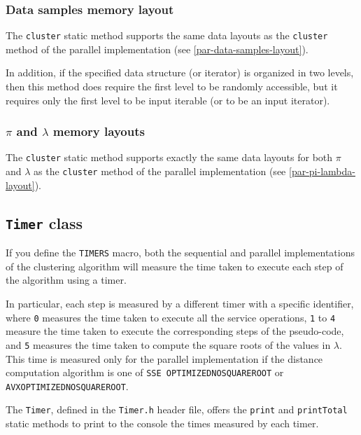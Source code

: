 \documentclass{article}
\begin{document}
\hypertarget{seq-data-samples-layout}{
\subsubsection{Data samples memory layout}
\label{seq-data-samples-layout}}

The \texttt{cluster} static method supports the same data layouts as the \texttt{cluster} method
of the parallel implementation (see \ref{par-data-samples-layout}).

In addition, if the specified data structure (or iterator) is organized in two levels, then this
method does require the first level to be randomly accessible, but it requires only the first
level to be input iterable (or to be an input iterator).

\hypertarget{seq-pi-lambda-layout}{
\subsubsection{\texorpdfstring{\boldmath$\pi$ and \boldmath$\lambda$}{pi and lambda} memory layouts}
\label{seq-pi-lambda-layout}}

The \texttt{cluster} static method supports exactly the same data layouts for both $\pi$
and $\lambda$ as the \texttt{cluster} method
of the parallel implementation (see \ref{par-pi-lambda-layout}).

\hypertarget{timers}{
\subsection{\texttt{Timer} class}
\label{timer}}

If you define the \texttt{TIMERS} macro, both the sequential and parallel implementations of the
clustering algorithm will measure the time taken to execute each step of the algorithm using a
timer.

In particular, each step is measured by a different timer with a specific identifier, where
\texttt{0} measures the time taken to execute all the service operations, \texttt{1} to
\texttt{4} measure the time taken to execute the corresponding steps of the pseudo-code,
and \texttt{5} measures the time taken to compute the square roots of the values in
$\lambda$. This time is measured only for the parallel implementation if the distance
computation algorithm is one of \texttt{SSE\textunderscore
OPTIMIZED\textunderscore NO\textunderscore SQUARE\textunderscore ROOT} or\\
\texttt{AVX\textunderscore OPTIMIZED\textunderscore NO\textunderscore SQUARE\textunderscore ROOT}.

The \texttt{Timer}, defined in the \texttt{Timer.h} header file, offers the \texttt{print} and
\texttt{printTotal} static methods to print to the console the times measured by each timer.
\end{document}
